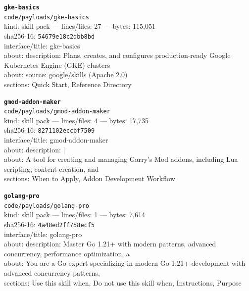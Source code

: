 \noindent\textbf{\texttt{gke-basics}}\\
\texttt{code/payloads/gke-basics}\\
kind: skill pack --- lines/files: 27 --- bytes: 115,051\\
sha256-16: \texttt{54679e18c2dbb8bd}\\
interface/title: gke-basics\\
about: description: Plans, creates, and configures production-ready Google Kubernetes Engine (GKE) clusters\\
about: source: google/skills (Apache 2.0)\\
sections: Quick Start, Reference Directory\\
\vspace*{6.0pt}

\noindent\textbf{\texttt{gmod-addon-maker}}\\
\texttt{code/payloads/gmod-addon-maker}\\
kind: skill pack --- lines/files: 4 --- bytes: 17,735\\
sha256-16: \texttt{8271102eccbf7509}\\
interface/title: gmod-addon-maker\\
about: description: |\\
about: A tool for creating and managing Garry's Mod addons, including Lua scripting, content creation, and \\
sections: When to Apply, Addon Development Workflow\\
\vspace*{6.0pt}

\noindent\textbf{\texttt{golang-pro}}\\
\texttt{code/payloads/golang-pro}\\
kind: skill pack --- lines/files: 1 --- bytes: 7,614\\
sha256-16: \texttt{4a48ed2ff758ecf5}\\
interface/title: golang-pro\\
about: description: Master Go 1.21+ with modern patterns, advanced concurrency, performance optimization, a\\
about: You are a Go expert specializing in modern Go 1.21+ development with advanced concurrency patterns, \\
sections: Use this skill when, Do not use this skill when, Instructions, Purpose\\
\vspace*{6.0pt}
\newpage

